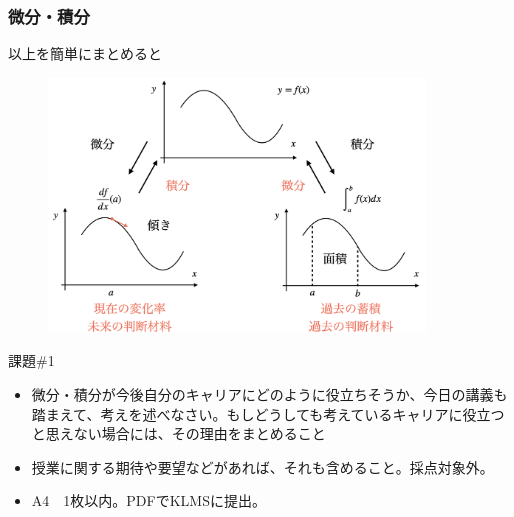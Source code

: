 


\begin{frame}
\frametitle{微分・積分}

以上を簡単にまとめると

 \begin{figure}[htbp]
 \begin{center} 
  \includegraphics[width=100mm]{calculus1/diff_int2.png}
 \end{center}
\end{figure}

\end{frame}
\begin{slide}{課題\#1}
\begin{itemize}
\item 微分・積分が今後自分のキャリアにどのように役立ちそうか、今日の講義も踏まえて、考えを述べなさい。もしどうしても考えているキャリアに役立つと思えない場合には、その理由をまとめること
\item 授業に関する期待や要望などがあれば、それも含めること。採点対象外。
\item A4　1枚以内。PDFでKLMSに提出。
\end{itemize}

\end{slide}



